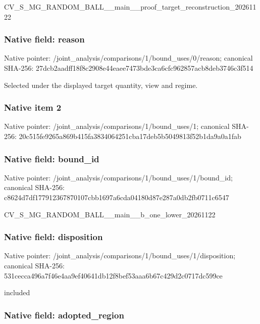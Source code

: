 \documentclass[10pt,a4paper]{article}
\begin{document}
CV\_S\_MG\_RANDOM\_BALL\_\_mai\allowbreak{}n\_\_proof\_target\_reconstr\allowbreak{}uction\_20261122


\subsubsection{Native field: reason}


Native pointer: /joint\_analysis/comparis\allowbreak{}ons/1/bound\_uses/0/reaso\allowbreak{}n; canonical SHA-256: 27dcb2aadff18f8c2908e44e\allowbreak{}aee7473bde3ca6cfc962857a\allowbreak{}cb8deb3746c3f514


Selected under the displayed target quantity, view and regime.


\subsubsection{Native item 2}


Native pointer: /joint\_analysis/comparis\allowbreak{}ons/1/bound\_uses/1; canonical SHA-256: 20c515fe9265a869b415fa38\allowbreak{}34064251cba17deb5b504981\allowbreak{}3f52b1da9a0a1fab



\subsubsection{Native field: bound\_id}


Native pointer: /joint\_analysis/comparis\allowbreak{}ons/1/bound\_uses/1/bound\allowbreak{}\_id; canonical SHA-256: c8624d7df177912367870107\allowbreak{}cbb1697a6cda04180d87e287\allowbreak{}a0db2fb0711c6547


CV\_S\_MG\_RANDOM\_BALL\_\_mai\allowbreak{}n\_\_b\_one\_lower\_20261122


\subsubsection{Native field: disposition}


Native pointer: /joint\_analysis/comparis\allowbreak{}ons/1/bound\_uses/1/dispo\allowbreak{}sition; canonical SHA-256: 531cecca496a7f46e4aa9ef4\allowbreak{}0641db12f8bef53aaa6b67c4\allowbreak{}29d2c0717dc599ce


included


\subsubsection{Native field: adopted\_region}
\end{document}
